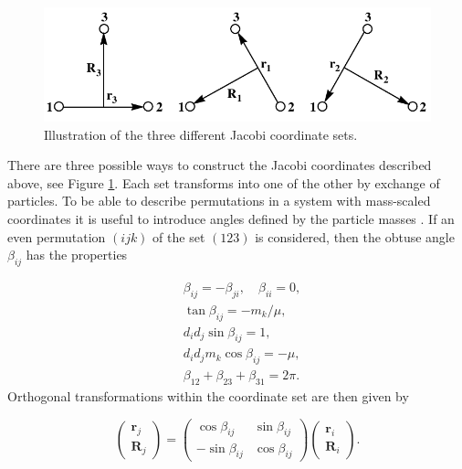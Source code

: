 \begin{figure}
	\includegraphics[width=\linewidth]{jacobii.pdf}
	\caption{Illustration of the three different Jacobi coordinate sets.}
	\label{fig:2}
\end{figure}

There are three possible ways to construct the Jacobi coordinates described above, see Figure \ref{fig:2}. Each set transforms into one of the other by exchange of particles. To be able to describe permutations in a system with mass-scaled coordinates it is useful to introduce angles defined by the particle masses \cite{Smith1962}. If an even permutation $(ijk)$ of the set $(123)$ is considered, then the obtuse angle $\beta_{ij}$ has the properties

\begin{subequations}
	\begin{align}
	&\beta_{ij} = -\beta_{ji}, \quad \beta_{ii} = 0,\\
	&\tan\beta_{ij} = -m_k/\mu,\\
	&d_{i}d_{j} \sin\beta_{ij} = 1,\\
	&d_{i}d_{j} m_{k} \cos\beta_{ij} = -\mu,\\
	&\beta_{12}+\beta_{23}+\beta_{31} = 2\pi.
	\end{align}
\end{subequations}
Orthogonal transformations within the coordinate set are then given by 

\begin{equation}
\begin{pmatrix}
\mathbf{r}_j\\
\mathbf{R}_j
\end{pmatrix}
=
\begin{pmatrix}
\cos\beta_{ij} & \sin\beta_{ij}\\
-\sin\beta_{ij} & \cos\beta_{ij}
\end{pmatrix}
\begin{pmatrix}
\mathbf{r}_i\\
\mathbf{R}_i
\end{pmatrix}.
\end{equation}

